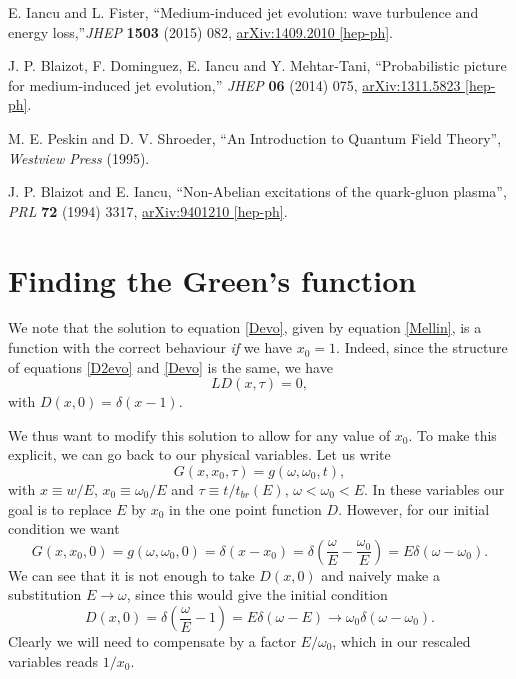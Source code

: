 \documentclass[a4paper,12pt]{article}
\numberwithin{equation}{section}
\begin{document}
\begin{thebibliography}{10}
  
  
  
 E. Iancu and L. Fister, ``Medium-induced jet evolution: wave turbulence and energy loss,''{\em JHEP} {\bf 1503} (2015) 082,
 \href{http://arxiv.org/abs/1409.2010}{{\ttfamily arXiv:1409.2010 [hep-ph]}}.




J. P. Blaizot, F. Dominguez, E. Iancu and Y. Mehtar-Tani, ``Probabilistic picture for medium-induced jet evolution,'' {\em JHEP} {\bf 06} (2014) 075,
 \href{http://arxiv.org/abs/1311.5823}{{\ttfamily arXiv:1311.5823 [hep-ph]}}.
 	
M. E. Peskin and D. V. Shroeder, ``An Introduction to Quantum Field Theory'', \emph{Westview Press} (1995).

J. P. Blaizot and E. Iancu, ``Non-Abelian excitations of the quark-gluon plasma'', {\em PRL} {\bf 72} (1994) 3317,
\href{https://arxiv.org/abs/hep-ph/9401210}{{\ttfamily arXiv:9401210 [hep-ph]}}.
 	
\end{thebibliography}
\newpage
\appendix




\section{Finding the Green's function}
We note that the solution to equation \eqref{Devo}, given by equation \eqref{Mellin}, is a function with the correct behaviour \emph{if} we have $x_0=1$. Indeed, since the structure of equations \eqref{D2evo} and \eqref{Devo} is the same, we have
\begin{equation}
L D(x,\tau)=0,
\end{equation}
with $D(x,0)=\delta(x-1)$.


We thus want to modify this solution to allow for any value of $x_0$. To make this explicit, we can go back to our physical variables. Let us write
\begin{equation}
G(x,x_0,\tau)=g(\omega, \omega_0,t),
\end{equation}
with $x \equiv w/E$, $x_0 \equiv \omega_0/E$ and $\tau \equiv t/t_{br}(E)$, $\omega < \omega_0 <E$. In these variables our goal is to replace $E$ by $x_0$ in the one point function $D$. However, for our initial condition we want
\begin{equation}
G(x,x_0,0)=g(\omega,\omega_0,0)=\delta(x-x_0)=\delta \left( \frac{\omega}{E} - \frac{\omega_0}{E}\right)=E\delta(\omega-\omega_0).
\end{equation}
We can see that it is not enough to take $D(x,0)$ and naively make a substitution $E\rightarrow \omega$, since this would give the initial condition
\begin{equation}
D(x,0)=\delta\left(\frac{\omega}{E}-1\right)=E\delta(\omega-E)\rightarrow \omega_0 \delta(\omega-\omega_0).
\end{equation}
Clearly we will need to compensate by a factor $E/\omega_0$, which in our rescaled variables reads $1/x_0$.
\end{document}
